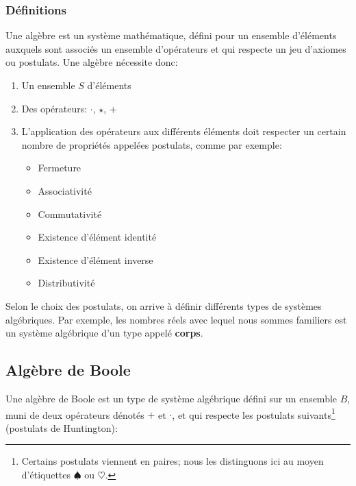 \documentclass[11pt]{article}
\begin{document}
\subsubsection{Définitions}
\label{sec:orgf34c634}

Une algèbre est un système mathématique, défini pour un ensemble
d'éléments auxquels sont associés un ensemble d'opérateurs et qui
respecte un jeu d'axiomes ou postulats. Une algèbre nécessite donc:

\begin{enumerate}
\item Un ensemble \(S\) d'éléments

\item Des opérateurs: \(\cdot\), \(\star\), \(+\)

\item L'application des opérateurs aux différents éléments doit respecter
un certain nombre de propriétés appelées postulats, comme par exemple:

\begin{itemize}
\item Fermeture

\item Associativité

\item Commutativité

\item Existence d'élément identité

\item Existence d'élément inverse

\item Distributivité
\end{itemize}
\end{enumerate}

Selon le choix des postulats, on arrive à définir différents types de
systèmes algébriques. Par exemple, les nombres réels avec lequel nous
sommes familiers est un système algébrique d'un type appelé \textbf{corps}.

\subsection{Algèbre de Boole}
\label{sec:orgcfa89af}

Une algèbre de Boole est un type de système algébrique défini sur un
ensemble \(B\), muni de deux opérateurs dénotés \(+\) et \(\cdot\), et qui
respecte les postulats suivants\footnote{Certains postulats viennent en paires; nous les distinguons ici au
moyen d'étiquettes \(\spadesuit\) ou \(\heartsuit\).} (postulats de Huntington):
\end{document}
